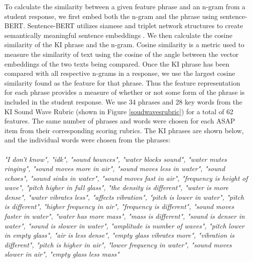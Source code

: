 To calculate the similarity between a given feature phrase and an n-gram from a student response, we first embed both the n-gram and the phrase using sentence-BERT. Sentence-BERT utilizes siamese and triplet network structures to create semantically meaningful sentence embeddings \cite{reimers2019sentence}. We then calculate the cosine similarity of the KI phrase and the n-gram. Cosine similarity is a metric used to measure the similarity of text using the cosine of the angle between the vector embeddings of the two texts being compared. Once the KI phrase has been compared with all respective n-grams in a response, we use the largest cosine similarity found as the feature for that phrase. Thus the feature representation for each phrase provides a measure of whether or not some form of the phrase is included in the student response. We use 34 phrases and 28 key words from the KI Sound Wave Rubric (shown in Figure \ref{soudwavesrubric}) for a total of 62 features. The same number of phrases and words were chosen for each ASAP item from their corresponding scoring rubrics. The KI phrases are shown below, and the individual words were chosen from the phrases: \\
\\
\textit{"I don’t know", "idk", "sound bounces", "water blocks sound", "water mutes ringing", "sound moves more in air", "sound moves less in water", "sound echoes", "sound sinks in water", "sound moves fast in air", "frequency is height of wave", "pitch higher in full glass", "the density is different",  "water is more dense", "water vibrates less", "affects vibration",  "pitch is lower in water", "pitch is different",  "higher frequency in air", "frequency is different", "sound moves faster in water", "water has more mass",  "mass is different", "sound is denser in water", "sound is slower in water", "amplitude is number of waves", "pitch lower in empty glass", "air is less dense", "empty glass vibrates more", "vibration is different", "pitch is higher in air", "lower frequency in water", "sound moves slower in air", "empty glass less mass"} 

